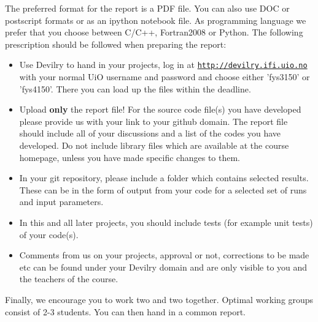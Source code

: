 \documentclass[%
oneside,                 %
final,                   %
10pt]{article}
\begin{document}
The preferred format for the report is a PDF file. You can also use DOC or postscript formats or as an ipython notebook file.  As programming language we prefer that you choose between C/C++, Fortran2008 or Python. The following prescription should be followed when preparing the report:

\begin{itemize}
  \item Use Devilry to hand in your projects, log in  at  \href{{http://devilry.ifi.uio.no}}{\nolinkurl{http://devilry.ifi.uio.no}} with your normal UiO username and password and choose either 'fys3150' or 'fys4150'. There you can load up the files within the deadline.

  \item Upload \textbf{only} the report file!  For the source code file(s) you have developed please provide us with your link to your github domain.  The report file should include all of your discussions and a list of the codes you have developed.  Do not include library files which are available at the course homepage, unless you have made specific changes to them.

  \item In your git repository, please include a folder which contains selected results. These can be in the form of output from your code for a selected set of runs and input parameters.

  \item In this and all later projects, you should include tests (for example unit tests) of your code(s).

  \item Comments  from us on your projects, approval or not, corrections to be made  etc can be found under your Devilry domain and are only visible to you and the teachers of the course.
\end{itemize}

\noindent
Finally, 
we encourage you to work two and two together. Optimal working groups consist of 
2-3 students. You can then hand in a common report. 




\end{document}
